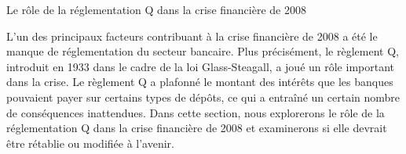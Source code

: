 \begin{frame}{ Le rôle de la réglementation Q dans la crise financière de 2008}


L’un des principaux facteurs contribuant à la crise financière de 2008 a été le manque de réglementation du secteur bancaire. Plus précisément, le règlement Q, introduit en 1933 dans le cadre de la loi Glass-Steagall, a joué un rôle important dans la crise. Le règlement Q a plafonné le montant des intérêts que les banques pouvaient payer sur certains types de dépôts, ce qui a entraîné un certain nombre de conséquences inattendues. Dans cette section, nous explorerons le rôle de la réglementation Q dans la crise financière de 2008 et examinerons si elle devrait être rétablie ou modifiée à l'avenir.
   
\end{frame}